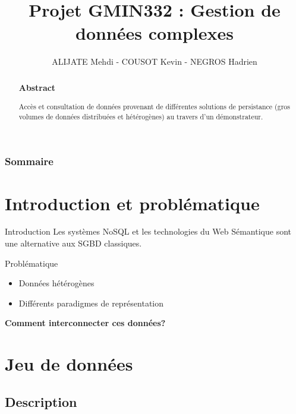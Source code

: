 \documentclass[12pt]{beamer}
\author{ALIJATE Mehdi - COUSOT Kevin - NEGROS Hadrien}
\title{Projet GMIN332 : Gestion de données complexes}
\begin{document}
\begin{frame}
\titlepage 


\end{frame}
\begin{frame}
\begin{abstract}
\frametitle{Abstract}
\begin{center}
Accès et consultation de données provenant de différentes solutions de persistance (gros volumes de données distribuées et hétérogènes) au travers d’un démonstrateur.
\end{center}
\end{abstract}
\end{frame}

\begin{frame}
\tableofcontents
\frametitle{Sommaire}


\end{frame}
\section{Introduction et problématique}

\begin{frame}
\begin{block}{Introduction}
Les systèmes NoSQL et les technologies du Web Sémantique sont une alternative aux SGBD classiques.
\end{block}

\begin{block}{Problématique}
\begin{itemize}
\item Données hétérogènes
\item Différents paradigmes de représentation
\end{itemize}
\end{block}



\begin{center}
\textbf{Comment interconnecter ces données?}
\end{center}


\end{frame}
\section{Jeu de données}

\subsection{Description}
\end{document}
